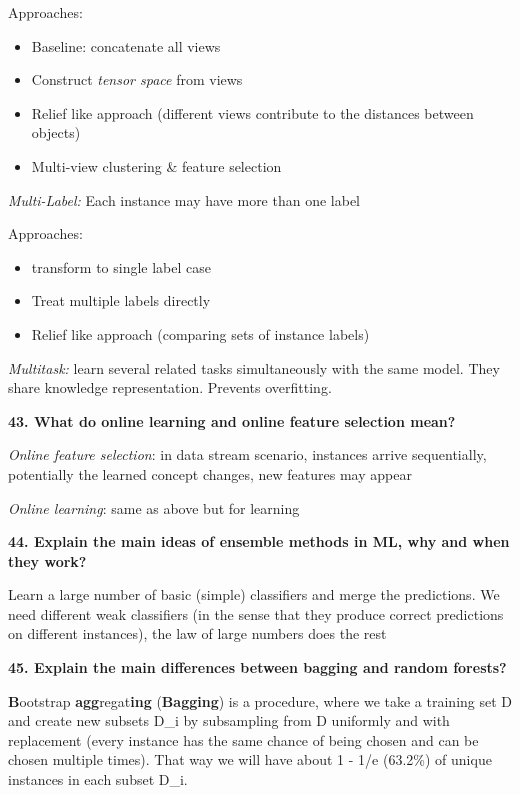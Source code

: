 Approaches:

\begin{itemize}
\item Baseline: concatenate all views
\item Construct \textit{tensor space} from views
\item Relief like approach (different views contribute to the distances
  between objects)
\item Multi-view clustering \& feature selection
\end{itemize}

\textit{Multi-Label:} Each instance may have more than one label

Approaches:

\begin{itemize}
\item transform to single label case
\item Treat multiple labels directly
\item Relief like approach (comparing sets of instance labels)
\end{itemize}

\textit{Multitask:} learn several related tasks simultaneously with
the same model. They share knowledge representation. Prevents
overfitting.

\textbf{43. What do online learning and online feature selection mean?}

\textit{Online feature selection}: in data stream scenario, instances
arrive sequentially, potentially the learned concept changes, new
features may appear

\textit{Online learning}: same as above but for learning

\textbf{44. Explain the main ideas of ensemble methods in ML, why and
when they work?}

Learn a large number of basic (simple) classifiers and merge the
predictions. We need different weak classifiers (in the sense that they
produce correct predictions on different instances), the law of large
numbers does the rest

\textbf{45. Explain the main differences between bagging and random
forests?}

\textbf{B}ootstrap \textbf{agg}regat\textbf{ing} (\textbf{Bagging}) is a
procedure, where we take a training set D and create new subsets D\_i by
subsampling from D uniformly and with replacement (every instance has
the same chance of being chosen and can be chosen multiple times). That
way we will have about 1 - 1/e (63.2\%) of unique instances in each
subset D\_i.

